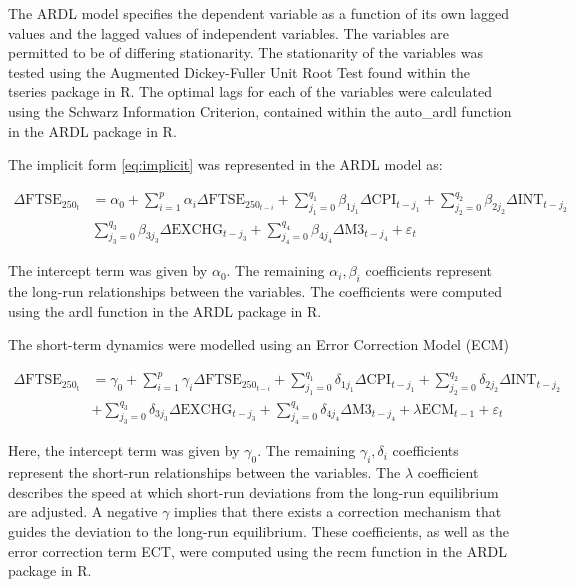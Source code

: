 \documentclass[11pt,a4paper]{article}
\begin{document}
The ARDL model specifies the dependent variable as a function of its own 
lagged values and the lagged values of independent variables. 
The variables are permitted to be of differing stationarity. The stationarity 
of the variables was tested using the Augmented Dickey-Fuller 
Unit Root Test found within the tseries package in R. The optimal lags for each of the 
variables were calculated using the Schwarz Information Criterion, contained
within the auto\_ardl function in the ARDL package in R. 

The implicit form \eqref{eq:implicit} was represented in the ARDL model as:

\begin{align*}
    \Delta \text{FTSE}_{250_t} &= \alpha_0 + \sum_{i=1}^{p} \alpha_i \Delta \text{FTSE}_{250_{t-i}} + \sum_{j_{1}=0}^{q_1} \beta_{1j_{1}} \Delta \text{CPI}_{t-j_{1}} + \sum_{j_{2}=0}^{q_2} \beta_{2j_{2}} \Delta \text{INT}_{t-j_{2}} \\
                               & \sum_{j_{3}=0}^{q_3} \beta_{3j_{3}} \Delta \text{EXCHG}_{t-j_{3}} + \sum_{j_{4}=0}^{q_4} \beta_{4j_{4}} \Delta \text{M3}_{t-j_{4}} + \varepsilon_t 
\end{align*}

The intercept term was given by $\alpha_0$. The 
remaining $\alpha_i, \beta_i$ coefficients represent the long-run relationships 
between the variables. The coefficients were computed using the ardl function in the 
ARDL package in R. 

The short-term dynamics were modelled using an Error Correction Model (ECM) 

\begin{align*}
    \Delta \text{FTSE}_{250_t} &= \gamma_0 + \sum_{i=1}^{p} \gamma_i \Delta \text{FTSE}_{250_{t-i}} + \sum_{j_{1}=0}^{q_1} \delta_{1j_{1}} \Delta \text{CPI}_{t-j_{1}} + \sum_{j_{2}=0}^{q_2} \delta_{2j_{2}} \Delta \text{INT}_{t-j_{2}} \\
                               & + \sum_{j_{3}=0}^{q_3} \delta_{3j_{3}} \Delta \text{EXCHG}_{t-j_{3}} + \sum_{j_{4}=0}^{q_4} \delta_{4j_{4}} \Delta \text{M3}_{t-j_{4}} + \lambda \text{ECM}_{t-1} + \varepsilon_t
\end{align*}
 
Here, the intercept term was given by $\gamma_0$. The 
remaining $\gamma_i, \delta_i$ coefficients represent the short-run 
relationships between the variables. The $\lambda$ coefficient 
describes the speed at which short-run deviations from the long-run equilibrium
are adjusted. A negative $\gamma$ implies that there exists a correction mechanism that guides the deviation 
to the long-run equilibrium. These coefficients, as well 
as the error correction term ECT, were computed using the recm function in the 
ARDL package in R.
\end{document}
